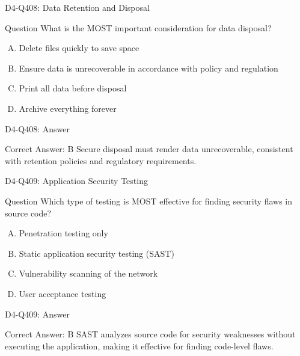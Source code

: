 \documentclass{beamer}
\begin{document}
\begin{frame}{D4-Q408: Data Retention and Disposal}
	\begin{block}{Question}
		What is the MOST important consideration for data disposal?
	\end{block}
	\begin{enumerate}[(A)]
		\item Delete files quickly to save space
		\item Ensure data is unrecoverable in accordance with policy and regulation
		\item Print all data before disposal
		\item Archive everything forever
	\end{enumerate}
\end{frame}
\begin{frame}{D4-Q408: Answer}
	\begin{block}{Correct Answer: B}
		Secure disposal must render data unrecoverable, consistent with retention policies and regulatory requirements.
	\end{block}
\end{frame}

\begin{frame}{D4-Q409: Application Security Testing}
	\begin{block}{Question}
		Which type of testing is MOST effective for finding security flaws in source code?
	\end{block}
	\begin{enumerate}[(A)]
		\item Penetration testing only
		\item Static application security testing (SAST)
		\item Vulnerability scanning of the network
		\item User acceptance testing
	\end{enumerate}
\end{frame}
\begin{frame}{D4-Q409: Answer}
	\begin{block}{Correct Answer: B}
		SAST analyzes source code for security weaknesses without executing the application, making it effective for finding code-level flaws.
	\end{block}
\end{frame}
\end{document}
